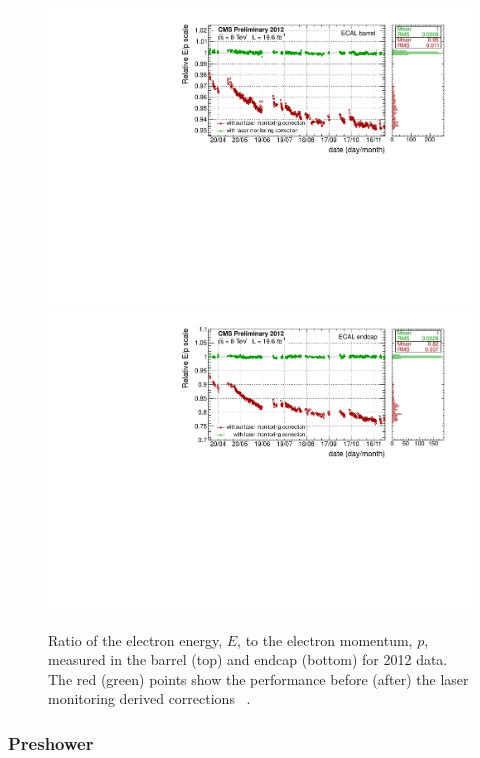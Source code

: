 \begin{figure}
  \includegraphics[width=\textwidth]{cms_experiment/plots/ecal_EB_lasercorrs.pdf} \\
  \includegraphics[width=\textwidth]{cms_experiment/plots/ecal_EE_lasercorrs.pdf} 
  \caption[ECAL laser corrections]{Ratio of the electron energy, $E$, to the electron momentum, $p$, measured in the \CMS barrel (top) and endcap (bottom) for 2012 data. The red (green) points show the performance before (after) the laser monitoring derived corrections ~\cite{cms-ecal-performance-2012}.}
  \label{fig:ecal_laser_corrs}
\end{figure}

\subsubsection{Preshower}

